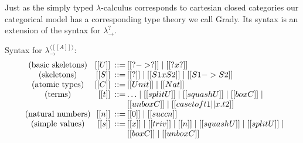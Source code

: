 Just as the simply typed $\lambda$-calculus corresponds to cartesian
closed categories our categorical model has a corresponding type
theory we call Grady.  Its syntax is an extension of the syntax for
$\lambda^?_\to$.

\begin{definition}
  \label{def:annotated-syntax}
  Syntax for $\lambda^{\langle [[A]] \rangle}_\to$:
  \[
  \begin{array}{c@{\hspace{5pt}}r@{}@{\hspace{5pt}}r@{}@{\hspace{2pt}}l@{}llllllllllll}
    \text{(basic skeletons)} & [[U]] & ::= & [[? -> ?]] \mid [[? x ?]]\\
    \text{(skeletons)}       & [[S]] & ::= & [[?]] \mid [[S1 x S2]] \mid [[S1 -> S2]]\\
    \text{(atomic types)}    & [[C]] & ::= & [[Unit]] \mid [[Nat]]\\
    \text{(terms)}           & [[t]] & ::= & \ldots \mid [[split U]] \mid [[squash U]] \mid [[box C]] \mid \\
                             &       &     & [[unbox C]] \mid [[case t of t1 || x.t2]]\\
    \text{(natural numbers)} & [[n]] & ::= & [[0]] \mid [[succ n]]\\
    \text{(simple values)}   & [[s]] & ::= & [[x]] \mid [[triv]] \mid [[n]] \mid [[squash U]] \mid [[split U]] \mid \\
                             &       &     & [[box C]] \mid [[unbox C]]\\   
  \end{array}
  \]
\end{definition}

